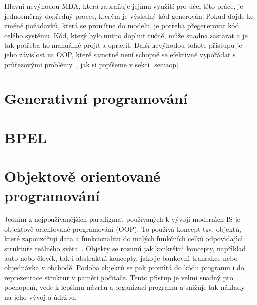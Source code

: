 Hlavní nevýhodou \gls{MDA}, která zabraňuje jejímu využití
pro účel této práce, je jednosměrný dopředný proces, kterým je výsledný kód generován.
Pokud dojde ke změně požadavků, která se promítne do modelu, je potřeba přegenerovat
kód celého systému. Kód, který bylo nutno doplnit ručně, může snadno zastarat a je tak
potřeba ho manuálně projít a opravit.
Další nevýhodou tohoto přístupu je jeho závislost na \gls{OOP},
které samotné není schopné se efektivně vypořádat s průřezovými
problémy~\cite{cemus2014aspect}, jak si popíšeme v sekci~\ref{sec:aop}.

\section{Generativní programování}


\section{BPEL}


\section{Objektově orientované programování}\label{sec:oop}

Jedn\'{\i}m z nejpoužívanějších paradigmat používaných k
v\'yvoji modern\'{\i}ch \gls{IS} je objektově orientované programován\'{\i} (\gls{OOP}).
To používá koncept tzv. objektů, které zapouzdřují data a funkcionalitu do
malých funkčních celků odpov\'{\i}daj\'{\i}c\'{\i} struktuře reálného světa~\cite{rentsch1982object}.
Objekty se rozum\'{\i} jak konkrétn\'{\i} koncepty, např\'{\i}klad auto nebo člověk, tak i
abstraktn\'{\i} koncepty, jako je bankovn\'{\i} transakce nebo objednávka v obchodě.
Podoba objektů se pak prom\'{\i}tá do kódu programu i do reprezentace struktur v paměti
poč\'{\i}tače. Tento př\'{\i}stup je velmi snadn\'y pro pochopen\'{\i},
vede k lepš\'{\i}mu návrhu a organizaci programu a snižuje
tak náklady na jeho v\'yvoj a údržbu.

